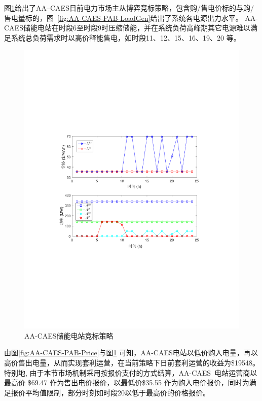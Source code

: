 图\ref{fig:Part-Load-PAB-Bid}给出了AA--CAES日前电力市场主从博弈竞标策略，包含购/售电价标的与购/售电量标的，图~\ref{fig:AA-CAES-PAB-LoadGen}给出了系统各电源出力水平。 AA-CAES储能电站在时段6至时段9时压缩储能，并在系统负荷高峰期其它电源难以满足系统总负荷需求时以高价释能售电，如时段11、12、15、16、19、20 等。

\begin{figure}[H] %
  \centering
  \includegraphics[scale=0.70]{figures/Chap3-10-PAB-Bid.pdf}
  \caption{AA-CAES储能电站竞标策略}
  \label{fig:Part-Load-PAB-Bid}
\end{figure}

由图\ref{fig:AA-CAES-PAB-Price}与图\ref{fig:Part-Load-PAB-Bid} 可知，AA-CAES电站以低价购入电量，再以高价售出电量，从而实现套利运营，在当前策略下日前套利运营的收益为\$19548。 特别地, 由于本节市场机制采用按报价支付的方式结算，AA-CAES~电站运营商以最高价 \$69.47 作为售出电价报价，以最低价\$35.55 作为购入电价报价，同时为满足报价平均值限制，部分时刻如时段20以低于最高价的价格报价。

